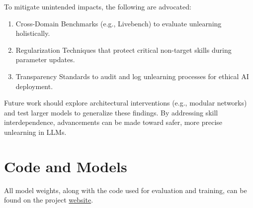 \documentclass[10pt]{article}
\begin{document}
To mitigate unintended impacts, the following are advocated:
\begin{enumerate}
    \item Cross-Domain Benchmarks (e.g., Livebench) to evaluate unlearning holistically.
    \item Regularization Techniques that protect critical non-target skills during parameter updates.
    \item Transparency Standards to audit and log unlearning processes for ethical AI deployment.
\end{enumerate}
Future work should explore architectural interventions (e.g., modular networks) and test larger models to generalize these findings. By addressing skill interdependence, advancements can be made toward safer, more precise unlearning in LLMs.

\section{Code and Models}
All model weights, along with the code used for evaluation and training, can be found on the project \href{https://johnphan19.github.io/csci5541-final-project/}{website}.
% 

\end{document}
